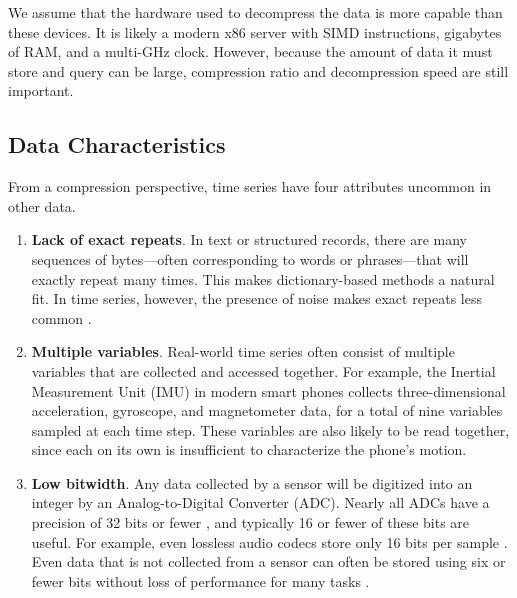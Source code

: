We assume that the hardware used to decompress the data is more capable than these devices. It is likely a modern x86 server with SIMD instructions, gigabytes of RAM, and a multi-GHz clock. However, because the amount of data it must store and query can be large, compression ratio and decompression speed are still important.

\subsection{Data Characteristics}

From a compression perspective, time series have four attributes uncommon in other data.

\begin{enumerate}
    \item \textbf{Lack of exact repeats}. In text or structured records, there are many sequences of bytes---often corresponding to words or phrases---that will exactly repeat many times. This makes dictionary-based methods a natural fit. In time series, however, the presence of noise makes exact repeats less common \cite{extract, epenthesis}.
    \item \textbf{Multiple variables}. Real-world time series often consist of multiple variables that are collected and accessed together. For example, the Inertial Measurement Unit (IMU) in modern smart phones collects three-dimensional acceleration, gyroscope, and magnetometer data, for a total of nine variables sampled at each time step. These variables are also likely to be read together, since each on its own is insufficient to characterize the phone's motion. %
    \item \textbf{Low bitwidth}. Any data collected by a sensor will be digitized into an integer by an Analog-to-Digital Converter (ADC). Nearly all ADCs have a precision of 32 bits or fewer \cite{digikeyADCs}, and typically 16 or fewer of these bits are useful. For example, even lossless audio codecs store only 16 bits per sample \cite{flac, shorten}. Even data that is not collected from a sensor can often be stored using six or fewer bits without loss of performance for many tasks \cite{epenthesis, mdlIntrinsic, sax}.

\end{enumerate}
